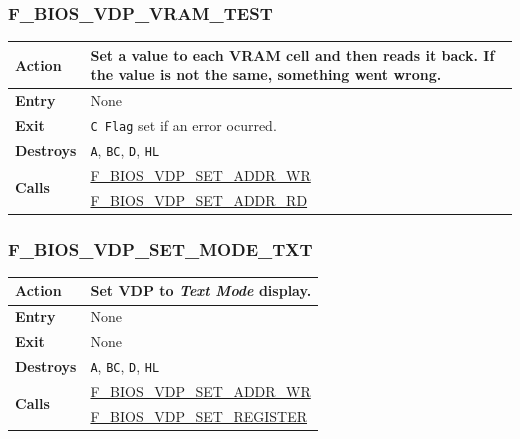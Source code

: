 \documentclass[a4paper,11pt]{article}
\begin{document}
        \subsubsection{F\_BIOS\_VDP\_VRAM\_TEST}
        \label{func:fbiosvdpvramtest}
        \begin{tabular}{l p{9cm}}
            \hline\textbf{Action}
            & Set a value to each \textbf{VRAM} cell and then reads it back. If
            the value is not the same, something went wrong. \\
            \hline\textbf{Entry} & None\\
            \hline\textbf{Exit} & \texttt{C Flag} set if an error ocurred.\\
            \hline\textbf{Destroys} & \texttt{A}, \texttt{BC}, \texttt{D},
            \texttt{HL} \\
            \hline\multirow[t]{2}{4em}{\textbf{Calls}}
            & \hyperref[func:fbiosvdpsetaddrwr]{F\_BIOS\_VDP\_SET\_ADDR\_WR}\\
            & \hyperref[func:fbiosvdpsetaddrrd]{F\_BIOS\_VDP\_SET\_ADDR\_RD}\\
            \hline
        \end{tabular}

        \subsubsection{F\_BIOS\_VDP\_SET\_MODE\_TXT}
        \label{func:fbiosvdpsetmodetxt}
        \begin{tabular}{l p{9cm}}
            \hline\textbf{Action}
            & Set \textbf{VDP} to \textit{Text Mode} display.\\
            \hline\textbf{Entry} & None\\
            \hline\textbf{Exit} & None\\
            \hline\textbf{Destroys} & \texttt{A}, \texttt{BC}, \texttt{D},
            \texttt{HL} \\
            \hline\multirow[t]{2}{4em}{\textbf{Calls}}
            & \hyperref[func:fbiosvdpsetaddrwr]{F\_BIOS\_VDP\_SET\_ADDR\_WR}\\
            & \hyperref[func:fbiosvdpsetregister]{F\_BIOS\_VDP\_SET\_REGISTER}\\
            \hline
        \end{tabular}
\end{document}
